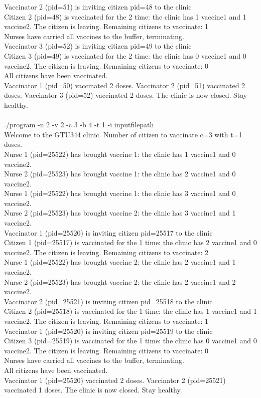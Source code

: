 \documentclass{article}
\begin{document}
Vaccinator 2 (pid=51) is inviting citizen pid=48 to the clinic\\
Citizen 2 (pid=48) is vaccinated for the 2 time: the clinic has 1 vaccine1 and 1 vaccine2. The citizen is leaving. Remaining citizens to vaccinate: 1\\
Nurses have carried all vaccines to the buffer, terminating.\\
Vaccinator 3 (pid=52) is inviting citizen pid=49 to the clinic\\
Citizen 3 (pid=49) is vaccinated for the 2 time: the clinic has 0 vaccine1 and 0 vaccine2. The citizen is leaving. Remaining citizens to vaccinate: 0\\
All citizens have been vaccinated.\\
Vaccinator 1 (pid=50) vaccinated 2 doses. Vaccinator 2 (pid=51) vaccinated 2 doses. Vaccinator 3 (pid=52) vaccinated 2 doses. The clinic is now closed. Stay healthy.\\\\

./program -n 2 -v 2 -c 3 -b 4 -t 1 -i inputfilepath\\
Welcome to the GTU344 clinic. Number of citizen to vaccinate c=3 with t=1 doses.\\
Nurse 1 (pid=25522) has brought vaccine 1: the clinic has 1 vaccine1 and 0 vaccine2.\\
Nurse 2 (pid=25523) has brought vaccine 1: the clinic has 2 vaccine1 and 0 vaccine2.\\
Nurse 1 (pid=25522) has brought vaccine 1: the clinic has 3 vaccine1 and 0 vaccine2.\\
Nurse 2 (pid=25523) has brought vaccine 2: the clinic has 3 vaccine1 and 1 vaccine2.\\
Vaccinator 1 (pid=25520) is inviting citizen pid=25517 to the clinic\\
Citizen 1 (pid=25517) is vaccinated for the 1 time: the clinic has 2 vaccine1 and 0 vaccine2. The citizen is leaving. Remaining citizens to vaccinate: 2\\
Nurse 1 (pid=25522) has brought vaccine 2: the clinic has 2 vaccine1 and 1 vaccine2.\\
Nurse 2 (pid=25523) has brought vaccine 2: the clinic has 2 vaccine1 and 2 vaccine2.\\
Vaccinator 2 (pid=25521) is inviting citizen pid=25518 to the clinic\\
Citizen 2 (pid=25518) is vaccinated for the 1 time: the clinic has 1 vaccine1 and 1 vaccine2. The citizen is leaving. Remaining citizens to vaccinate: 1\\
Vaccinator 1 (pid=25520) is inviting citizen pid=25519 to the clinic\\
Citizen 3 (pid=25519) is vaccinated for the 1 time: the clinic has 0 vaccine1 and 0 vaccine2. The citizen is leaving. Remaining citizens to vaccinate: 0\\
Nurses have carried all vaccines to the buffer, terminating.\\
All citizens have been vaccinated.\\
Vaccinator 1 (pid=25520) vaccinated 2 doses. Vaccinator 2 (pid=25521) vaccinated 1 doses. The clinic is now closed. Stay healthy.\\
\end{document}
